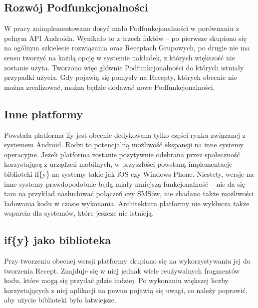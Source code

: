 \documentclass[11pt,a4paper,polish,thesis]{dcsbook}
\begin{document}
\subsection{Rozwój Podfunkcjonalności}
W pracy zaimplementowano dosyć mało Podfunkcjonalności w porównaniu z pełnym API Androida. Wynikało to z trzech faktów -- po pierwsze skupiono się na ogólnym szkielecie rozwiązania oraz Receptach Grupowych, po drugie nie ma sensu tworzyć na każdą opcję w systemie nakładek, z których większość nie zostanie użyta. Tworzono więc głównie Podfunkcjonalności do których istniały przypadki użycia. Gdy pojawią się pomysły na Recepty, których obecnie nie można zrealizować, można będzie dodawać nowe Podfunkcjonalności. 
\subsection{Inne platformy}
Powstała platforma if{y} jest obecnie dedykowana tylko części rynku związanej z systemem Android. Rodzi to potencjalną możliwość ekspansji na inne systemy operacyjne. 
Jeżeli platforma zostanie pozytywnie odebrana przez społeczność korzystającą z urządzeń mobilnych, w przyszłości powstaną implementacje biblioteki if\{y\} na systemy
takie jak iOS czy Windows Phone. Niestety, wersje na inne systemy prawdopodobnie będą miały mniejszą funkcjonalność -- nie da się tam na przykład nasłuchiwać połączeń czy SMSów, nie zbadano także możliwości ładowania kodu w czasie wykonania. Architektura platformy nie wyklucza także wsparcia dla systemów, które jeszcze nie istnieją.
\subsection{if\{y\} jako biblioteka}
Przy tworzeniu obecnej wersji platformy skupiano się na wykorzystywaniu jej do tworzenia Recept. Znajduje się w niej jednak wiele reużywalnych fragmentów kodu, które mogą się przydać gdzie indziej. Po wykonaniu większej liczby korzystających z niej aplikacji na pewno pojawią się uwagi, co należy poprawić, aby użycie biblioteki było łatwiejsze.

\appendix 
\end{document}
